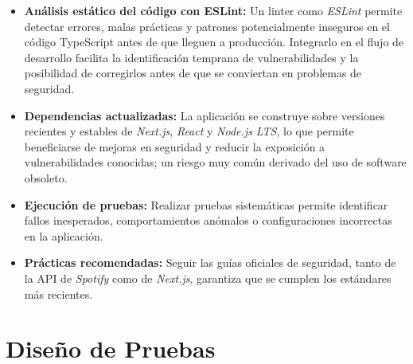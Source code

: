 \begin{itemize}
    \item \textbf{Análisis estático del código con ESLint:} Un linter como \textit{ESLint} permite detectar errores, malas prácticas y patrones potencialmente inseguros en el código TypeScript antes de que lleguen a producción. Integrarlo en el flujo de desarrollo facilita la identificación temprana de vulnerabilidades y la posibilidad de corregirlos antes de que se conviertan en problemas de seguridad.

    \item \textbf{Dependencias actualizadas:} La aplicación se construye sobre versiones recientes y estables de \textit{Next.js}, \textit{React} y \textit{Node.js LTS}, lo que permite beneficiarse de mejoras en seguridad y reducir la exposición a vulnerabilidades conocidas; un riesgo muy común derivado del uso de software obsoleto.

    \item \textbf{Ejecución de pruebas:} Realizar pruebas sistemáticas permite identificar fallos inesperados, comportamientos anómalos o configuraciones incorrectas en la aplicación.

    \item \textbf{Prácticas recomendadas:} Seguir las guías oficiales de seguridad, tanto de la API de \textit{Spotify} como de \textit{Next.js}, garantiza que se cumplen los estándares más recientes.
\end{itemize}

\section{Diseño de Pruebas}